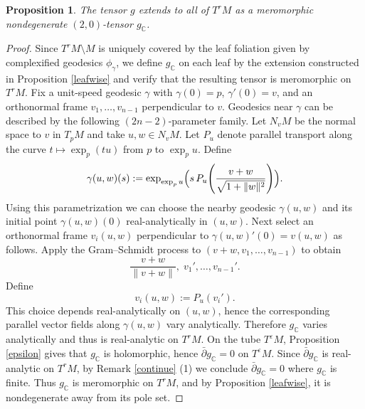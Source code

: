 \documentclass[a4paper, 12pt]{article}
\newcommand{\gC}{g_{\mathbb{C}}}
\newtheorem{prop}[thm]{Proposition}
\begin{document}
\begin{prop}\label{global}
The tensor $g$ extends to all of $T^r M$ as a meromorphic nondegenerate $(2,0)$-tensor $\gC$.
\end{prop}
\begin{proof}
Since $T^r M\setminus M$ is uniquely covered by the leaf foliation given by complexified geodesics $\phi_\gamma$, we define $\gC$ on each leaf by the extension constructed in Proposition \ref{leafwise} and verify that the resulting tensor is meromorphic on $T^r M$.
Fix a unit-speed geodesic $\gamma$ with $\gamma(0)=p$, $\gamma'(0)=v$, and an orthonormal frame $v_1,\dots,v_{n-1}$ perpendicular to $v$.
Geodesics near $\gamma$ can be described by the following $(2n-2)$-parameter family.
Let $N_vM$ be the normal space to $v$ in $T_pM$ and take $u,w\in N_vM$.
Let $P_u$ denote parallel transport along the curve $t\mapsto \exp_p(tu)$ from $p$ to $\exp_p u$.
Define
\[
\gamma(u,w)(s):=\exp_{\exp_pu}\Bigl(s\,P_u\!\left(\frac{v+w}{\sqrt{1+\|w\|^2}}\right)\Bigr).
\]
Using this parametrization we can choose the nearby geodesic $\gamma(u,w)$ and its initial point $\gamma(u,w)(0)$ real-analytically in $(u,w)$.
Next select an orthonormal frame $v_i(u,w)$ perpendicular to $\gamma(u,w)'(0)=v(u,w)$ as follows.
Apply the Gram--Schmidt process to $(v+w,v_1,\dots,v_{n-1})$ to obtain
\[
\frac{v+w}{\|v+w\|},\;v_1',\dots,v_{n-1}'.
\]
Define
\[
v_i(u,w):=P_u(v_i').
\]
This choice depends real-analytically on $(u,w)$, hence the corresponding parallel vector fields along $\gamma(u,w)$ vary analytically.
Therefore $\gC$ varies analytically and thus is real-analytic on $T^r M$.
On the tube $T^\varepsilon M$, Proposition \ref{epsilon} gives that $\gC$ is holomorphic, hence $\bar\partial \gC=0$ on $T^\varepsilon M$.
Since $\bar\partial \gC$ is real-analytic on $T^r M$, by Remark \ref{continue} (1) we conclude $\bar\partial \gC=0$ where $\gC$ is finite.
Thus $\gC$ is meromorphic on $T^r M$, and by Proposition \ref{leafwise}, it is nondegenerate away from its pole set.
\end{proof}


\end{document}
